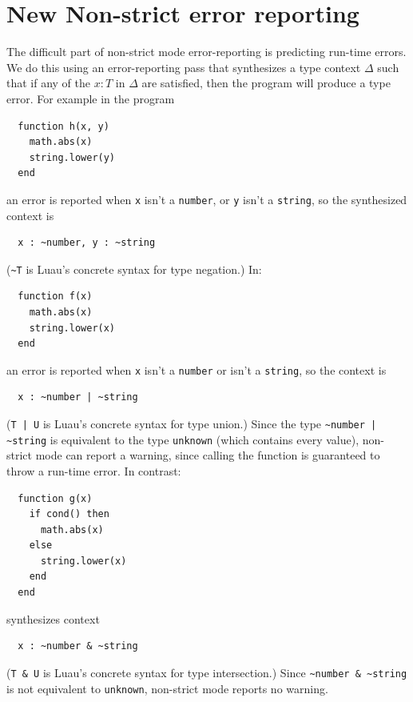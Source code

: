 \documentclass[sigplan]{acmart}
\begin{document}
\section{New Non-strict error reporting}

The difficult part of non-strict mode error-reporting is predicting
run-time errors. We do this using an error-reporting
pass that synthesizes a type context $\Delta$ such that if any of the $x : T$ in
$\Delta$ are satisfied, then the program will
produce a type error. For example in the program
\begin{verbatim}
  function h(x, y)
    math.abs(x)
    string.lower(y)
  end
\end{verbatim}
an error is reported when \verb|x| isn’t a \verb|number|, or \verb|y| isn’t a \verb|string|, so the synthesized context is
\begin{verbatim}
  x : ~number, y : ~string
\end{verbatim}
(\verb|~T| is Luau's concrete syntax for type negation.)
In:
\begin{verbatim}
  function f(x)
    math.abs(x)
    string.lower(x)
  end
\end{verbatim}
an error is reported when \verb|x| isn’t a \verb|number| or isn’t a \verb|string|, so the context is
\begin{verbatim}
  x : ~number | ~string
\end{verbatim}
(\verb"T | U" is Luau's concrete syntax for type union.)
Since the type \verb"~number | ~string" is equivalent to the type \verb|unknown| (which contains every value),
non-strict mode can report a warning, since calling the function is guaranteed to throw a run-time error.
In contrast:
\begin{verbatim}
  function g(x)
    if cond() then
      math.abs(x)
    else
      string.lower(x)
    end
  end
\end{verbatim}
synthesizes context
\begin{verbatim}
  x : ~number & ~string
\end{verbatim}
(\verb|T & U| is Luau's concrete syntax for type intersection.)
Since \verb|~number & ~string| is not equivalent to \verb|unknown|, non-strict mode reports no warning.
\end{document}
